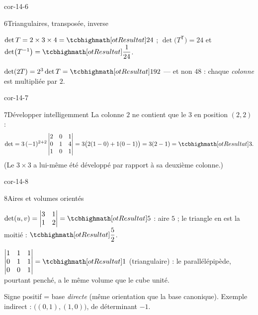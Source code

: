 \begin{blocLivre}{cor-14-6}
\begin{corrige}{6}{Triangulaires, transposée, inverse}
\begin{questions}
  \item $\det T=2\times3\times4=\res{24}$ ;
    $\det\bigl(T^{\mathsf T}\bigr)=24$ et
    $\det\bigl(T^{-1}\bigr)=\res{\dfrac{1}{24}}$.
  \item $\det(2T)=2^{3}\det T=\res{192}$ — et non $48$ : chaque
    \emph{colonne} est multipliée par $2$.
\end{questions}
\end{corrige}
\end{blocLivre}

\begin{blocLivre}{cor-14-7}
\begin{corrige}{7}{Développer intelligemment}
La colonne $2$ ne contient que le $3$ en position $(2,2)$ :
\[
\det=3\,(-1)^{2+2}
\begin{vmatrix}2&0&1\\0&1&4\\1&0&1\end{vmatrix}
=3\bigl(2(1-0)+1(0-1)\bigr)=3(2-1)=\res{3}.
\]
(Le $3\times3$ a lui-même été développé par rapport à sa deuxième
colonne.)
\end{corrige}
\end{blocLivre}

\begin{blocLivre}{cor-14-8}
\begin{corrige}{8}{Aires et volumes orientés}
\begin{questions}
  \item $\det(u,v)=\begin{vmatrix}3&1\\1&2\end{vmatrix}=\res{5}$ : aire
    $5$ ; le triangle en est la moitié : $\res{\dfrac52}$.
  \item $\begin{vmatrix}1&1&1\\0&1&1\\0&0&1\end{vmatrix}=\res{1}$
    (triangulaire) : le parallélépipède, pourtant penché, a le même volume
    que le cube unité.
  \item Signe positif = base \emph{directe} (même orientation que la base
    canonique). Exemple indirect : $\bigl((0,1),(1,0)\bigr)$, de
    déterminant $-1$.
\end{questions}
\end{corrige}
\end{blocLivre}

